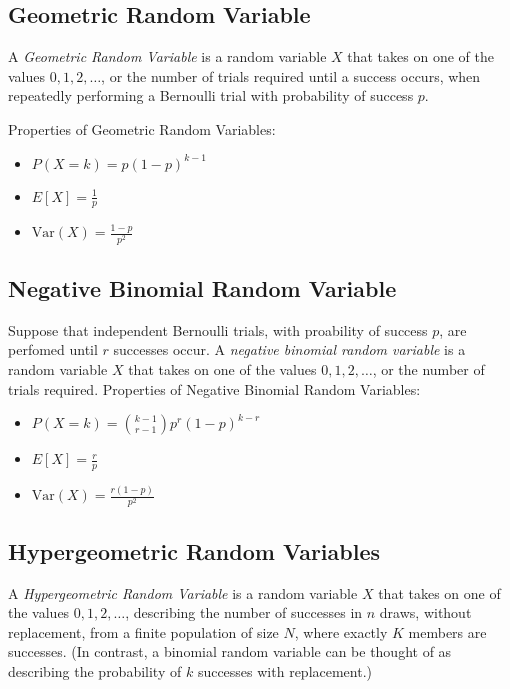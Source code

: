 \documentclass[10pt]{article}
\theoremstyle{definition}
\theoremstyle{theorem}
\begin{document}
		\subsection*{Geometric Random Variable}
		A \emph{Geometric Random Variable} is a random variable $X$ that takes on one of the values $0, 1, 2, \ldots$, or the number of trials required until a success occurs, when repeatedly performing a Bernoulli trial with probability of success $p$.
		
		Properties of Geometric Random Variables:
		\begin{multicols}{3}
			\begin{itemize}
				\item $P(X=k) = p(1-p)^{k-1}$
				\item $E[X] = \frac{1}{p}$
				\item $\text{Var}(X)= \frac{1-p}{p^2} $
			\end{itemize}
		\end{multicols}
		
		\subsection*{Negative Binomial Random Variable}
		
		Suppose that independent Bernoulli trials, with proability of success $p$, are perfomed until $r$ successes occur. A \emph{negative binomial random variable} is a random variable $X$ that takes on one of the values $0, 1, 2, \ldots$, or the number of trials required.
		Properties of Negative Binomial Random Variables:
		
		\begin{multicols}{3}
			\begin{itemize}
				\item $P(X=k) = {{k-1} \choose {r-1}}p^r(1-p)^{k-r}$
				\item $E[X] = \frac{r}{p}$
				\item $\text{Var}(X)= \frac{r(1-p)}{p^2} $
			\end{itemize}
		\end{multicols}
		
		\subsection*{Hypergeometric Random Variables}
		A \emph{Hypergeometric Random Variable} is a random variable $X$ that takes on one of the values $0, 1, 2, \ldots$, describing the number of successes in $n$ draws, without replacement, from a finite population of size $N$, where exactly $K$ members are successes. (In contrast, a binomial random variable can be thought of as describing the probability of $k$ successes with replacement.)
		
\end{document}
